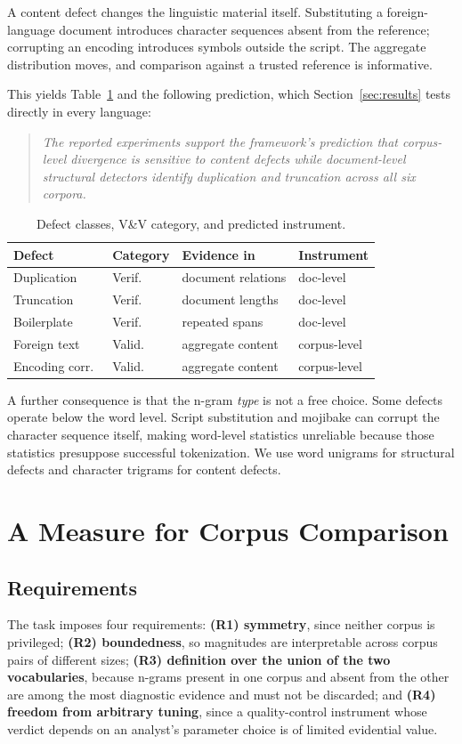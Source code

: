 \documentclass[conference]{IEEEtran}
\begin{document}
A content defect changes the linguistic material itself. Substituting a
foreign-language document introduces character sequences absent from the
reference; corrupting an encoding introduces symbols outside the script. The
aggregate distribution moves, and comparison against a trusted reference is
informative.

This yields Table~\ref{tab:framework} and the following prediction, which
Section~\ref{sec:results} tests directly in every language:

\begin{quote}
\emph{The reported experiments support the framework's prediction that corpus-level divergence is sensitive to content defects while document-level structural detectors identify duplication and truncation across all six corpora.}
\end{quote}

\begin{table}[hbt!]
\caption{Defect classes, V\&V category, and predicted instrument.}
\label{tab:framework}
\centering
\small
\setlength{\tabcolsep}{3pt}
\begin{tabular}{@{}llll@{}}
\toprule
Defect & Category & Evidence in & Instrument \\
\midrule
Duplication     & Verif.\ & document relations & doc-level \\
Truncation      & Verif.\ & document lengths   & doc-level \\
Boilerplate     & Verif.\ & repeated spans     & doc-level \\
Foreign text    & Valid.\ & aggregate content  & corpus-level \\
Encoding corr.\ & Valid.\ & aggregate content  & corpus-level \\
\bottomrule
\end{tabular}
\end{table}

A further consequence is that the n-gram \emph{type} is not a free choice.
Some defects operate below the word level. Script substitution and mojibake can corrupt the character sequence itself, making word-level statistics unreliable because those statistics presuppose successful tokenization. We use word unigrams for structural defects and character trigrams for
content defects.

\section{A Measure for Corpus Comparison}
\label{sec:method}
\subsection{Requirements}
The task imposes four requirements: \textbf{(R1) symmetry}, since neither corpus
is privileged; \textbf{(R2) boundedness}, so magnitudes are interpretable across
corpus pairs of different sizes; \textbf{(R3) definition over the union of the two
vocabularies}, because n-grams present in one corpus and absent from the other
are among the most diagnostic evidence and must not be discarded; and
\textbf{(R4) freedom from arbitrary tuning}, since a quality-control instrument
whose verdict depends on an analyst's parameter choice is of limited evidential
value.
\end{document}

